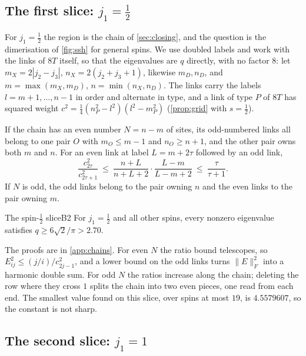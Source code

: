 \subsection{The first slice: \texorpdfstring{$j_1=\frac12$}{j1 = 1/2}}

For $j_1=\frac12$ the region is the chain of \cref{sec:closing}, and the question is
the dimerisation of \cref{fig:ssh} for general spins. We use doubled labels and work
with the links of $8T$ itself, so that the eigenvalues are $q$ directly, with no
factor $8$: let $m_X=2|j_2-j_3|$, $n_X=2(j_2+j_3+1)$, likewise
$m_D,n_D$, and $m=\max(m_X,m_D)$, $n=\min(n_X,n_D)$. The links carry the labels
$l=m+1,\dots,n-1$ in order and alternate in type, and a link of type $P$ of $8T$ has
squared weight $c^2=\frac14(n_P^2-l^2)(l^2-m_P^2)$ (\cref{prop:grid} with $s=\frac12$).

\begin{lemma}\label{lem:innerouter}
If the chain has an even number $N=n-m$ of sites, its odd-numbered links all belong to
one pair $O$ with $m_O\le m-1$ and $n_O\ge n+1$, and the other pair owns both $m$ and $n$.
For an even link at label $L=m+2\tau$ followed by an odd link,
\[
  \frac{c_{2\tau}^2}{c_{2\tau+1}^2}\ \le\ \frac{n+L}{n+L+2}\cdot\frac{L-m}{L-m+2}\ \le\ \frac{\tau}{\tau+1}.
\]
If $N$ is odd, the odd links belong to the pair owning $n$ and the even links to the pair
owning $m$.
\end{lemma}

\begin{theorem}{The spin-\texorpdfstring{$\frac12$}{1/2} slice}{B2}
For $j_1=\frac12$ and all other spins, every nonzero eigenvalue satisfies
$q\ge6\sqrt2/\pi>2.70$.
\end{theorem}

The proofs are in \cref{app:chains}. For even $N$ the ratio bound telescopes, so
$E_{ij}^2\le(j/i)/c_{2j-1}^2$, and a lower bound on the odd links turns $\|E\|_F^2$ into a
harmonic double sum. For odd $N$ the ratios increase along the chain; deleting the row
where they cross $1$ splits the chain into two even pieces, one read from each end.
The smallest value found on this slice, over spins at most $19$, is $4.5579607$, so the
constant is not sharp.

\subsection{The second slice: \texorpdfstring{$j_1=1$}{j1 = 1}}

